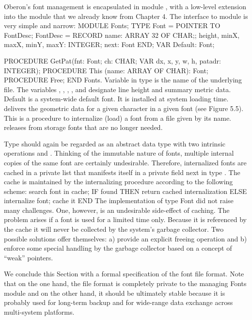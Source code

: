 Oberon's font management is encapsulated in module , with a low-level extension into the module  that we already know from Chapter 4. The interface to module  is very simple and narrow:
\begintt
MODULE Fonts;
  TYPE Font = POINTER TO FontDesc;
       FontDesc = RECORD
         name: ARRAY 32 OF CHAR;;
         height, minX, maxX, minY, maxY: INTEGER;
         next: Font
         END;
  VAR Default: Font;
  
  PROCEDURE GetPat(fnt: Font; ch: CHAR;
                   VAR dx, x, y, w, h, patadr: INTEGER);
  PROCEDURE This (name: ARRAY OF CHAR): Font;
  PROCEDURE Free;
END Fonts.
\endtt
\noindent Variable  in type  is the name of the underlying file. The variables , , , , and  designate line height and summary metric data. Default is a system-wide default font. It is installed at system loading time.  delivers the geometric data for a given character in a given font (see Figure 5.5). This is a procedure to internalize (load) a font from a file given by its name.  releases from storage fonts that are no longer needed.

Type  should again be regarded as an abstract data type with two intrinsic operations  and . Thinking of the immutable nature of fonts, multiple internal copies of the same font are certainly undesirable. Therefore, internalized fonts are cached in a private list that manifests itself in a private field next in type . The cache is maintained by the internalizing procedure  according to the following scheme:
\begintt
search font in cache;
IF found THEN return cached internalization
  ELSE internalize font; cache it
END
\endtt
\noindent The implementation of type Font did not raise many challenges. One, however, is an undesirable side-effect of caching. The problem arises if a font is used for a limited time only. Because it is referenced by the cache it will never be collected by the system's garbage collector. Two possible solutions offer themselves: a) provide an explicit freeing operation and b) enforce some special handling by the garbage collector based on a concept of ``weak'' pointers.

We conclude this Section with a formal specification of the font file format. Note that on the one hand, the file format is completely private to the managing Fonts module and on the other hand, it should be ultimately stable because it is probably used for long-term backup and for wide-range data exchange across multi-system platforms.

